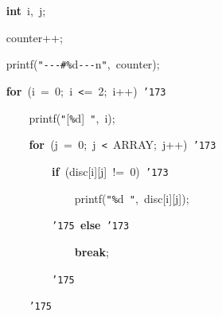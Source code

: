 \documentclass[a4paper,10pt]{article}
\def\mc{\relax}
\begin{document}
\noindent
\mbox{}{\tt\mc \ }{\tt\mc \ }{\tt\mc \ }{\tt\mc \ }\textbf{int}{\tt\mc \ }i,{\tt\mc \ }j;

\noindent
\mbox{}\hfill

\noindent
\mbox{}{\tt\mc \ }{\tt\mc \ }{\tt\mc \ }{\tt\mc \ }counter++;

\noindent
\mbox{}{\tt\mc \ }{\tt\mc \ }{\tt\mc \ }{\tt\mc \ }printf({\tt "}{\tt -}{\tt -}{\tt -}{\tt\#}{\tt\%}d{\tt -}{\tt -}{\tt -}{\tt{}}n{\tt "},{\tt\mc \ }counter);

\noindent
\mbox{}{\tt\mc \ }{\tt\mc \ }{\tt\mc \ }{\tt\mc \ }\textbf{for}{\tt\mc \ }(i{\tt\mc \ }={\tt\mc \ }0;{\tt\mc \ }i{\tt\mc \ }{\tt <}={\tt\mc \ }2;{\tt\mc \ }i++){\tt\mc \ }{\tt\char'173}

\noindent
\mbox{}{\tt\mc \ }{\tt\mc \ }{\tt\mc \ }{\tt\mc \ }{\tt\mc \ }{\tt\mc \ }{\tt\mc \ }{\tt\mc \ }printf({\tt "}[{\tt\%}d]{\tt\mc \ }{\tt "},{\tt\mc \ }i);

\noindent
\mbox{}{\tt\mc \ }{\tt\mc \ }{\tt\mc \ }{\tt\mc \ }{\tt\mc \ }{\tt\mc \ }{\tt\mc \ }{\tt\mc \ }\textbf{for}{\tt\mc \ }(j{\tt\mc \ }={\tt\mc \ }0;{\tt\mc \ }j{\tt\mc \ }{\tt <}{\tt\mc \ }ARRAY;{\tt\mc \ }j++){\tt\mc \ }{\tt\char'173}

\noindent
\mbox{}{\tt\mc \ }{\tt\mc \ }{\tt\mc \ }{\tt\mc \ }{\tt\mc \ }{\tt\mc \ }{\tt\mc \ }{\tt\mc \ }{\tt\mc \ }{\tt\mc \ }{\tt\mc \ }{\tt\mc \ }\textbf{if}{\tt\mc \ }(disc[i][j]{\tt\mc \ }!={\tt\mc \ }0){\tt\mc \ }{\tt\char'173}

\noindent
\mbox{}{\tt\mc \ }{\tt\mc \ }{\tt\mc \ }{\tt\mc \ }{\tt\mc \ }{\tt\mc \ }{\tt\mc \ }{\tt\mc \ }{\tt\mc \ }{\tt\mc \ }{\tt\mc \ }{\tt\mc \ }{\tt\mc \ }{\tt\mc \ }{\tt\mc \ }{\tt\mc \ }printf({\tt "}{\tt\%}d{\tt\mc \ }{\tt "},{\tt\mc \ }disc[i][j]);

\noindent
\mbox{}{\tt\mc \ }{\tt\mc \ }{\tt\mc \ }{\tt\mc \ }{\tt\mc \ }{\tt\mc \ }{\tt\mc \ }{\tt\mc \ }{\tt\mc \ }{\tt\mc \ }{\tt\mc \ }{\tt\mc \ }{\tt\char'175}{\tt\mc \ }\textbf{else}{\tt\mc \ }{\tt\char'173}

\noindent
\mbox{}{\tt\mc \ }{\tt\mc \ }{\tt\mc \ }{\tt\mc \ }{\tt\mc \ }{\tt\mc \ }{\tt\mc \ }{\tt\mc \ }{\tt\mc \ }{\tt\mc \ }{\tt\mc \ }{\tt\mc \ }{\tt\mc \ }{\tt\mc \ }{\tt\mc \ }{\tt\mc \ }\textbf{break};

\noindent
\mbox{}{\tt\mc \ }{\tt\mc \ }{\tt\mc \ }{\tt\mc \ }{\tt\mc \ }{\tt\mc \ }{\tt\mc \ }{\tt\mc \ }{\tt\mc \ }{\tt\mc \ }{\tt\mc \ }{\tt\mc \ }{\tt\char'175}

\noindent
\mbox{}{\tt\mc \ }{\tt\mc \ }{\tt\mc \ }{\tt\mc \ }{\tt\mc \ }{\tt\mc \ }{\tt\mc \ }{\tt\mc \ }{\tt\char'175}
\end{document}
